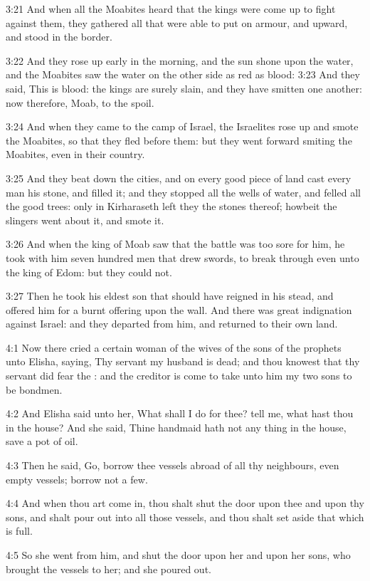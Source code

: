 3:21 And when all the Moabites heard that the kings were come up to fight against them, they gathered all that were able to put on armour, and upward, and stood in the border.

3:22 And they rose up early in the morning, and the sun shone upon the water, and the Moabites saw the water on the other side as red as blood: 3:23 And they said, This is blood: the kings are surely slain, and they have smitten one another: now therefore, Moab, to the spoil.

3:24 And when they came to the camp of Israel, the Israelites rose up and smote the Moabites, so that they fled before them: but they went forward smiting the Moabites, even in their country.

3:25 And they beat down the cities, and on every good piece of land cast every man his stone, and filled it; and they stopped all the wells of water, and felled all the good trees: only in Kirharaseth left they the stones thereof; howbeit the slingers went about it, and smote it.

3:26 And when the king of Moab saw that the battle was too sore for him, he took with him seven hundred men that drew swords, to break through even unto the king of Edom: but they could not.

3:27 Then he took his eldest son that should have reigned in his stead, and offered him for a burnt offering upon the wall. And there was great indignation against Israel: and they departed from him, and returned to their own land.

4:1 Now there cried a certain woman of the wives of the sons of the prophets unto Elisha, saying, Thy servant my husband is dead; and thou knowest that thy servant did fear the \LORD: and the creditor is come to take unto him my two sons to be bondmen.

4:2 And Elisha said unto her, What shall I do for thee? tell me, what hast thou in the house? And she said, Thine handmaid hath not any thing in the house, save a pot of oil.

4:3 Then he said, Go, borrow thee vessels abroad of all thy neighbours, even empty vessels; borrow not a few.

4:4 And when thou art come in, thou shalt shut the door upon thee and upon thy sons, and shalt pour out into all those vessels, and thou shalt set aside that which is full.

4:5 So she went from him, and shut the door upon her and upon her sons, who brought the vessels to her; and she poured out.

